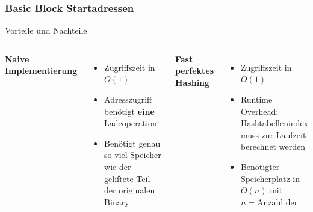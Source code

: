 \begin{frame}
    \frametitle{Basic Block Startadressen}{Vorteile und Nachteile}
    \vspace{1cm}
    \begin{columns}[t]
        \textbf{Naive Implementierung}
        \begin{itemize}
            \vspace{1em}
            \setlength{\itemsep}{1em}
            \item Zugriffszeit in $O(1)$
            \item Adresszugriff benötigt \textbf{eine} Ladeoperation
            \item Benötigt genau so viel Speicher wie der geliftete Teil der originalen Binary
        \end{itemize}
        \textbf{Fast perfektes Hashing}
        \begin{itemize}
            \vspace{1em}
            \setlength{\itemsep}{1em}
            \item Zugriffszeit in $O(1)$
            \item Runtime Overhead: Hashtabellenindex muss zur Laufzeit berechnet werden
            \item Benötigter Speicherplatz in $O(n)$ mit $n = \text{Anzahl der Startadressen}$
        \end{itemize}
    \end{columns}
\end{frame}
\clearpage



